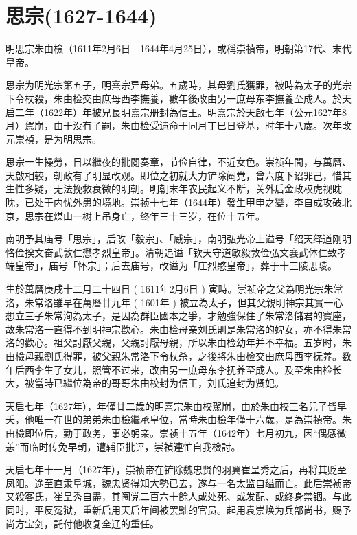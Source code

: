 
\section{思宗\tiny(1627-1644)}

明思宗朱由檢（1611年2月6日－1644年4月25日），或稱崇禎帝，明朝第17代、末代皇帝。

思宗为明光宗第五子，明熹宗异母弟。五歲時，其母劉氏獲罪，被時為太子的光宗下令杖殺，朱由检交由庶母西李撫養，數年後改由另一庶母东李撫養至成人。於天启二年（1622年）年被兄長明熹宗册封為信王。明熹宗於天啟七年（公元1627年8月）駕崩，由于没有子嗣，朱由检受遗命于同月丁巳日登基，时年十八歲。次年改元崇禎，是为明思宗。

思宗一生操勞，日以繼夜的批閱奏章，节俭自律，不近女色。崇祯年間，与萬曆、天啟相较，朝政有了明显改观。即位之初就大力铲除阉党，曾六度下诏罪己，惜其生性多疑，无法挽救衰微的明朝。明朝末年农民起义不断，关外后金政权虎视眈眈，已处于内忧外患的境地。崇祯十七年（1644年）發生甲申之變，李自成攻破北京，思宗在煤山一树上吊身亡，终年三十三岁，在位十五年。

南明予其庙号「思宗」，后改「毅宗」、「威宗」，南明弘光帝上谥号「绍天绎道刚明恪俭揆文奋武敦仁懋孝烈皇帝」。清朝追谥「钦天守道敏毅敦俭弘文襄武体仁致孝端皇帝」，庙号「怀宗」；后去庙号，改谥为「庄烈愍皇帝」，葬于十三陵思陵。

生於萬曆庚戌十二月二十四日 ( 1611年2月6日 ) 寅時。崇祯帝之父為明光宗朱常洛，朱常洛雖早在萬曆廿九年 ( 1601年 ) 被立為太子，但其父親明神宗其實一心想立三子朱常洵為太子，是因為群臣國本之爭，才勉強保住了朱常洛儲君的寶座，故朱常洛一直得不到明神宗歡心。朱由检母亲刘氏則是朱常洛的婢女，亦不得朱常洛的歡心。祖父討厭父親，父親討厭母親，所以朱由检幼年并不幸福。五岁时，朱由檢母親劉氏得罪，被父親朱常洛下令杖杀，之後將朱由检交由庶母西李抚养。数年后西李生了女儿，照管不过来，改由另一庶母东李抚养至成人。及至朱由检长大，被當時已繼位為帝的哥哥朱由校封为信王，刘氏追封为贤妃。

天启七年（1627年），年僅廿二歲的明熹宗朱由校駕崩，由於朱由校三名兒子皆早夭，他唯一在世的弟弟朱由檢繼承皇位，當時朱由檢年僅十六歲，是為崇禎帝。朱由檢即位后，勤于政务，事必躬亲。崇祯十五年（1642年）七月初九，因“偶感微恙”而临时传免早朝，遭辅臣批评，崇禎連忙自我檢討。

天启七年十一月（1627年），崇祯帝在铲除魏忠贤的羽翼崔呈秀之后，再将其贬至凤阳。途至直隶阜城，魏忠贤得知大勢已去，遂与一名太监自缢而亡。此后崇祯帝又殺客氏，崔呈秀自盡，其阉党二百六十餘人或处死、或发配、或终身禁锢。与此同时，平反冤狱，重新启用天启年间被罢黜的官员。起用袁崇焕为兵部尚书，赐予尚方宝剑，託付他收复全辽的重任。

